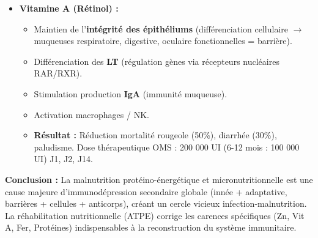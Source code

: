 \documentclass[11pt]{article}
\begin{document}
\begin{exoresolu}
\begin{enumerate}
\begin{itemize}
\begin{itemize}
                    \item Essentiel pour l'activité de la \textbf{thymidine kinase} (synthèse ADN $\rightarrow$ prolifération clonale lymphocytaire).
                    \item Stabilise les membranes cellulaires, cofacteur superoxyde dismutase (Cu/Zn-SOD) $\rightarrow$ protection phagocytes contre leur propre burst oxydatif.
                    \item \textbf{Résultat :} Restauration de la thymopoïèse, de la prolifération lymphocytaire, de la cytotoxicité NK, de l'activité phagocytaire. Réduit durée/gravité diarrhées et pneumonies (recommandation OMS : 20 mg/jour 10-14 jours lors diarrhée aiguë).
                \end{itemize}
            \item \textbf{Vitamine A (Rétinol) :} 
                \begin{itemize}
                    \item Maintien de l'\textbf{intégrité des épithéliums} (différenciation cellulaire $\rightarrow$ muqueuses respiratoire, digestive, oculaire fonctionnelles = barrière).
                    \item Différenciation des \textbf{LT} (régulation gènes via récepteurs nucléaires RAR/RXR).
                    \item Stimulation production \textbf{IgA} (immunité muqueuse).
                    \item Activation macrophages / NK.
                    \item \textbf{Résultat :} Réduction mortalité rougeole (50\%), diarrhée (30\%), paludisme. Dose thérapeutique OMS : 200 000 UI (6-12 mois : 100 000 UI) J1, J2, J14.
                \end{itemize}
        \end{itemize}
    \end{enumerate}
    \textbf{Conclusion :} La malnutrition protéino-énergétique et micronutritionnelle est une cause majeure d'immunodépression secondaire globale (innée + adaptative, barrières + cellules + anticorps), créant un cercle vicieux infection-malnutrition. La réhabilitation nutritionnelle (ATPE) corrige les carences spécifiques (Zn, Vit A, Fer, Protéines) indispensables à la reconstruction du système immunitaire.
\end{exoresolu}
\end{document}
